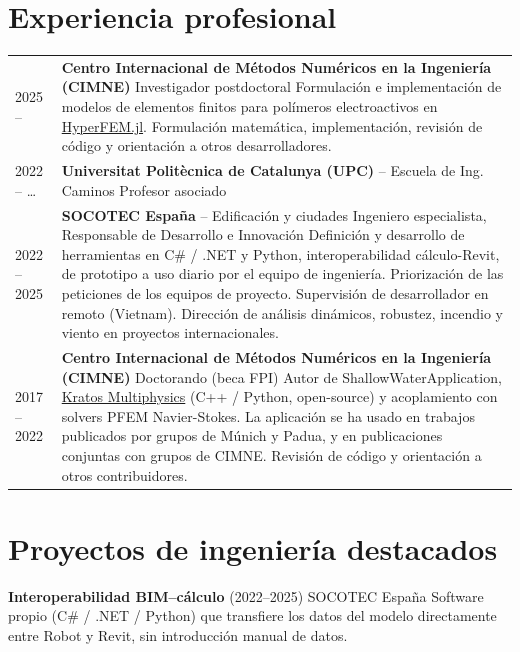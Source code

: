 \documentclass[12pt]{article}
\begin{document}
\section{Experiencia profesional}
\begin{tabularx}{\linewidth}{lX}
    2025 -- \enspace 2026 &
    \textbf{Centro Internacional de Métodos Numéricos en la Ingeniería (CIMNE)} \newline
    Investigador postdoctoral \newline
    Formulación e implementación de modelos de elementos finitos para polímeros electroactivos en \href{https://github.com/MultiSimOLab/HyperFEM.jl}{HyperFEM.jl}. Formulación matemática, implementación, revisión de código y orientación a otros desarrolladores. \\[.4em]

    2022 -- \enspace \dots &
    \textbf{Universitat Politècnica de Catalunya (UPC)} -- Escuela de Ing. Caminos \newline
    Profesor asociado \\[.4em]

    2022 -- 2025 &
    \textbf{SOCOTEC España} -- Edificación y ciudades \newline
    Ingeniero especialista, Responsable de Desarrollo e Innovación \newline
    Definición y desarrollo de herramientas en C\# / .NET y Python, interoperabilidad cálculo-Revit, de prototipo a uso diario por el equipo de ingeniería. Priorización de las peticiones de los equipos de proyecto. Supervisión de desarrollador en remoto (Vietnam). Dirección de análisis dinámicos, robustez, incendio y viento en proyectos internacionales. \\[.4em]

    2017 -- 2022 &
    \textbf{Centro Internacional de Métodos Numéricos en la Ingeniería (CIMNE)} \newline
    Doctorando (beca FPI)
    Autor de ShallowWaterApplication, \href{https://github.com/KratosMultiphysics/Kratos}{Kratos Multiphysics} (C++ / Python, open-source) y acoplamiento con solvers PFEM Navier-Stokes. La aplicación se ha usado en trabajos publicados por grupos de Múnich y Padua, y en publicaciones conjuntas con grupos de CIMNE. Revisión de código y orientación a otros contribuidores. \\
\end{tabularx}


\section{Proyectos de ingeniería destacados}
\parbox{\linewidth}{
    \textbf{Interoperabilidad BIM--cálculo} (2022--2025) SOCOTEC España \newline
    Software propio (C\# / .NET / Python) que transfiere los datos del modelo directamente entre Robot y Revit, sin introducción manual de datos.}
\end{document}
